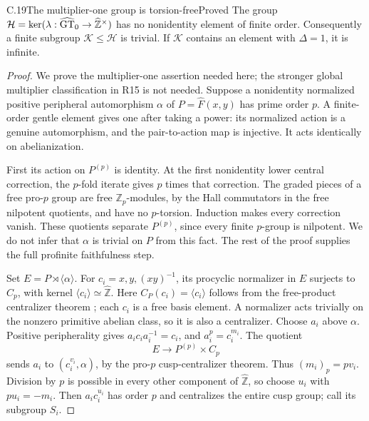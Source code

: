 \begin{statement}{C.19}{The multiplier-one group is torsion-free}{Proved}
The group
\(\mathcal H=\ker(\lambda:\widehat{\rm GT}_0
\to\widehat{\mathbb Z}^{\times})\)
has no nonidentity element of finite order.
Consequently a finite subgroup
\(\mathcal K\leq\mathcal H\) is trivial.
If \(\mathcal K\) contains an element
with \(\Delta=1\), it is infinite.
\end{statement}
\begin{proof}
We prove the multiplier-one assertion
needed here; the stronger global
multiplier classification in R15 is
not needed. Suppose a nonidentity
normalized positive peripheral
automorphism \(\alpha\) of
\(P=\widehat F(x,y)\) has prime
order \(p\). A finite-order gentle
element gives one after taking a
power: its normalized action is
a genuine automorphism, and the
pair-to-action map is injective.
It acts identically on abelianization.

First its action on \(P^{(p)}\)
is identity. At the first nonidentity
lower central correction, the
\(p\)-fold iterate gives \(p\)
times that correction.
The graded pieces of a free pro-\(p\)
group are free \(\mathbb Z_p\)-modules,
by the Hall commutators in the free
nilpotent quotients, and have no
\(p\)-torsion. Induction makes every
correction vanish. These quotients
separate \(P^{(p)}\), since every
finite \(p\)-group is nilpotent.
We do not infer that \(\alpha\)
is trivial on \(P\) from this fact.
The rest of the proof supplies the
full profinite faithfulness step.

Set \(E=P\rtimes\langle\alpha\rangle\).
For \(c_i=x,y,(xy)^{-1}\), its
procyclic normalizer in \(E\)
surjects to \(C_p\), with kernel
\(\langle c_i\rangle\simeq\widehat{\mathbb Z}\).
Here
\(C_P(c_i)=\langle c_i\rangle\)
follows from the free-product
centralizer theorem
\citep[Theorem B', p.~159]{cHerfortRibes1985};
each \(c_i\) is a free basis element.
A normalizer acts trivially on
the nonzero primitive abelian class,
so it is also a centralizer.
Choose \(a_i\) above \(\alpha\).
Positive peripherality gives
\(a_ic_ia_i^{-1}=c_i\), and
\(a_i^p=c_i^{m_i}\).
The quotient
\[
 E\longrightarrow P^{(p)}\times C_p
\]
sends \(a_i\) to
\((c_i^{v_i},\alpha)\), by the
pro-\(p\) cusp-centralizer theorem.
Thus \((m_i)_p=pv_i\).
Division by \(p\) is possible in
every other component of
\(\widehat{\mathbb Z}\), so choose
\(u_i\) with \(pu_i=-m_i\).
Then \(a_ic_i^{u_i}\) has order
\(p\) and centralizes the entire
cusp group; call its subgroup \(S_i\).


\end{proof}
